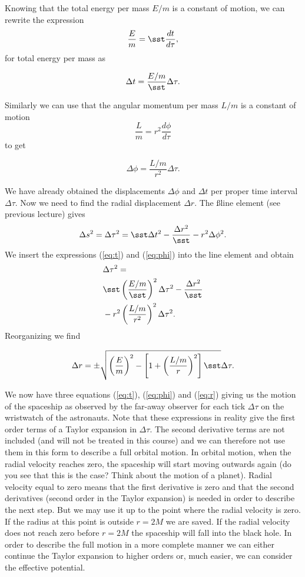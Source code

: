 \begin{multicols}{2}
Knowing that the total energy per mass $E/m$ is a constant of motion, we can rewrite the expression
\[
\frac{E}{m}=\sst\frac{dt}{d\tau},
\]
for total energy per mass as
\begin{formbox}
\begin{equation}
\label{eq:t}
\Delta t=\frac{E/m}{\sst}\Delta\tau.
\end{equation}
\end{formbox}
Similarly we can use that the angular momentum per mass $L/m$ is a constant of motion
\[
\frac{L}{m}=r^2\frac{d\phi}{d\tau}
\]
to get
\begin{formbox}
\begin{equation}
\label{eq:phi}
\Delta\phi=\frac{L/m}{r^2}\Delta\tau.
\end{equation}
\end{formbox}
We have already obtained the displacements $\Delta\phi$ and $\Delta t$ per proper time interval $\Delta\tau$. Now we need to find the radial displacement $\Delta r$. The \ss line element (see previous lecture) gives
\[
\Delta s^2=\Delta\tau^2=\sst\Delta t^2-\frac{\Delta r^2}{\sst}-r^2\Delta\phi^2.
\]
We insert the expressions (\ref{eq:t}) and (\ref{eq:phi}) into the line element and obtain
\begin{align*}
&\Delta\tau^2=\\
&\sst\left(\frac{E/m}{\sst}\right)^2\Delta\tau^2-\frac{\Delta r^2}{\sst}\\
&-r^2\left(\frac{L/m}{r^2}\right)^2\Delta\tau^2.
\end{align*}
Reorganizing we find
\begin{formbox}
\begin{equation}
\label{eq:r}
\Delta r=\pm\sqrt{\left(\frac{E}{m}\right)^2-\left[1+\left(\frac{L/m}{r}\right)^2\right]\sst}\Delta\tau.
\end{equation}
\end{formbox}
We now have three equations (\ref{eq:t}), (\ref{eq:phi}) and (\ref{eq:r}) giving us the motion of the spaceship as observed by the far-away observer for each tick $\Delta\tau$ on the wristwatch of the astronauts. Note that these expressions in reality give the first order terms of a Taylor expansion in $\Delta\tau$. The second derivative terms are not included (and will not be treated in this course) and we can therefore not use them in this form to describe a full orbital motion. In orbital motion, when the radial velocity reaches zero, the spaceship will start moving outwards again (do you see that this is the case? Think about the motion of a planet). Radial velocity equal to zero means that the first derivative is zero and that the second derivatives (second order in the Taylor expansion) is needed in order to describe the next step. But we may use it up to the point where the radial velocity is zero. If the radius at this point is outside $r=2M$ we are saved. If the radial velocity does not reach zero before $r=2M$ the spaceship will fall into the black hole. In order to describe the full motion in a more complete manner we can either continue the Taylor expansion to higher orders or, much easier, we can consider the effective potential.


\end{multicols}
